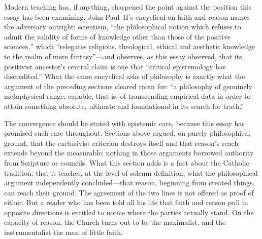 Modern teaching has, if anything, sharpened the point against the position this essay has been examining. John Paul~II's encyclical on faith and reason names the adversary outright: scientism, ``the philosophical notion which refuses to admit the validity of forms of knowledge other than those of the positive sciences,'' which ``relegates religious, theological, ethical and aesthetic knowledge to the realm of mere fantasy''---and observes, as this essay observed, that its positivist ancestor's central claim is one that ``critical epistemology has discredited.'' What the same encyclical asks of philosophy is exactly what the argument of the preceding sections cleared room for: ``a philosophy of genuinely metaphysical range, capable, that is, of transcending empirical data in order to attain something absolute, ultimate and foundational in its search for truth.''

The convergence should be stated with epistemic care, because this essay has promised such care throughout. Sections above argued, on purely philosophical ground, that the exclusivist criterion destroys itself and that reason's reach extends beyond the measurable; nothing in those arguments borrowed authority from Scripture or councils. What this section adds is a fact about the Catholic tradition: that it teaches, at the level of solemn definition, what the philosophical argument independently concluded---that reason, beginning from created things, can reach their ground. The agreement of the two lines is not offered as proof of either. But a reader who has been told all his life that faith and reason pull in opposite directions is entitled to notice where the parties actually stand. On the capacity of reason, the Church turns out to be the maximalist, and the instrumentalist the man of little faith.
